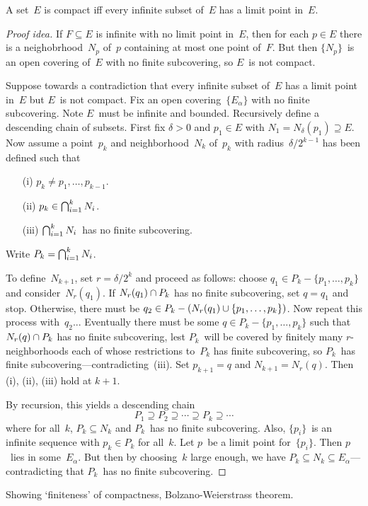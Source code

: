 \begin{thm}
A set~\(E\) is compact iff every infinite subset of~\(E\) has a limit point in~\(E\).
\end{thm}
\begin{proof}[Proof idea]
If \(F\subseteq E\) is infinite with no limit point in~\(E\), then for each \(p\in E\) there is a neighobrhood~\(N_p\) of~\(p\) containing at most one point of~\(F\). But then \(\{N_p\}\)~is an open covering of~\(E\) with no finite subcovering, so \(E\)~is not compact.

Suppose towards a contradiction that every infinite subset of~\(E\) has a limit point in~\(E\) but \(E\)~is not compact. Fix an open covering~\(\{E_{\alpha}\}\) with no finite subcovering. Note \(E\)~must be infinite and bounded. Recursively define a descending chain of subsets. First fix \(\delta>0\) and \(p_1\in E\) with \(N_1=N_{\delta}(p_1)\supseteq E\). Now assume a point~\(p_k\) and neighborhood~\(N_k\) of~\(p_k\) with radius~\(\delta/2^{k-1}\) has been defined such that
\begin{enumerate}[itemsep=0pt]
\item[(i)] \(p_k\ne p_1,\ldots,p_{k-1}\).
\item[(ii)] \(p_k\in\bigcap_{i=1}^k N_i\).
\item[(iii)] \(\bigcap_{i=1}^k N_i\)~has no finite subcovering.
\end{enumerate}
Write \(P_k=\bigcap_{i=1}^k N_i\).

To define~\(N_{k+1}\), set \(r=\delta/2^k\) and proceed as follows: choose \(q_1\in P_k-\{p_1,\ldots,p_k\}\) and consider~\(N_r(q_1)\). If \(N_r(q_1)\cap P_k\) has no finite subcovering, set \(q=q_1\) and stop. Otherwise, there must be \(q_2\in P_k-(N_r(q_1)\cup\{p_1,\ldots,p_k\})\). Now repeat this process with~\(q_2\)... Eventually there must be some \(q\in P_k-\{p_1,\ldots,p_k\}\) such that \(N_r(q)\cap P_k\) has no finite subcovering, lest \(P_k\)~will be covered by finitely many \(r\)-neighborhoods each of whose restrictions to~\(P_k\) has finite subcovering, so \(P_k\)~has finite subcovering---contradicting~(iii). Set \(p_{k+1}=q\) and \(N_{k+1}=N_r(q)\). Then (i), (ii), (iii) hold at \(k+1\).

By recursion, this yields a descending chain
\[P_1\supseteq P_2\supseteq\cdots\supseteq P_k\supseteq\cdots\]
where for all~\(k\), \(P_k\subseteq N_k\) and \(P_k\)~has no finite subcovering. Also, \(\{p_i\}\)~is an infinite sequence with \(p_k\in P_k\) for all~\(k\). Let \(p\)~be a limit point for~\(\{p_i\}\). Then \(p\)~lies in some~\(E_{\alpha}\). But then by choosing~\(k\) large enough, we have \(P_k\subseteq N_k\subseteq E_{\alpha}\)---contradicting that \(P_k\)~has no finite subcovering.
\end{proof}
\begin{app}
Showing `finiteness' of compactness, Bolzano-Weierstrass theorem.
\end{app}

